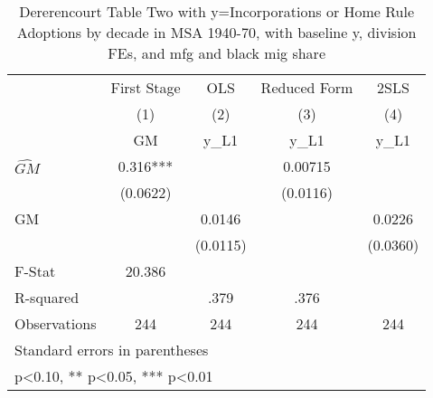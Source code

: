 \begin{table}[htbp]\centering
\def\sym#1{\ifmmode^{#1}\else\(^{#1}\)\fi}
\caption{Dererencourt Table Two with y=Incorporations or Home Rule Adoptions by decade in MSA 1940-70, with baseline y, division FEs, and mfg and black mig share}
\begin{tabular}{l*{4}{c}}
\toprule
                    & First Stage   &         OLS   &Reduced Form   &        2SLS   \\
                    &\multicolumn{1}{c}{(1)}&\multicolumn{1}{c}{(2)}&\multicolumn{1}{c}{(3)}&\multicolumn{1}{c}{(4)}\\
                    &\multicolumn{1}{c}{GM}&\multicolumn{1}{c}{y\_L1}&\multicolumn{1}{c}{y\_L1}&\multicolumn{1}{c}{y\_L1}\\
\midrule
$\hat{GM}$          &       0.316***&               &     0.00715   &               \\
                    &    (0.0622)   &               &    (0.0116)   &               \\
\addlinespace
GM                  &               &      0.0146   &               &      0.0226   \\
                    &               &    (0.0115)   &               &    (0.0360)   \\
\midrule
F-Stat              &      20.386   &               &               &               \\
R-squared           &               &        .379   &        .376   &               \\
Observations        &         244   &         244   &         244   &         244   \\
\bottomrule
\multicolumn{5}{l}{\footnotesize Standard errors in parentheses}\\
\multicolumn{5}{l}{\footnotesize * p<0.10, ** p<0.05, *** p<0.01}\\
\end{tabular}
\end{table}
